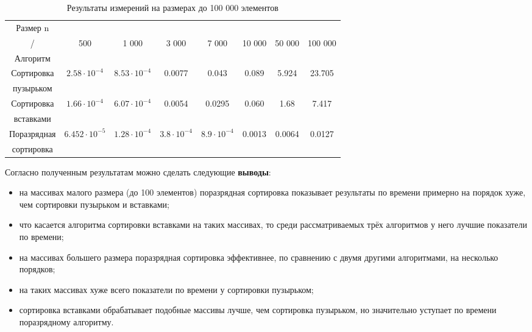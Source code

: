 \begin{table}[ph] \label{table_4_2}
	\caption{Результаты измерений на размерах до 100 000 элементов}
	\centering
	\begin{tabular}{|c|c|c|c|c|c|c|c|}
		\hline
		Размер n&&&&&&&\\
		/    &500 &1 000 & 3 000 & 7 000 & 10 000 & 50 000 & 100 000 \\
		Алгоритм    &&&&&&&\\
		\hline
		Сортировка & $2.58\cdot10^{-4}$ & $8.53\cdot10^{-4}$ & 0.0077 & 0.043 & 0.089 & 5.924 & 23.705\\
		пузырьком &&&&&&&\\
		\hline
		Сортировка & $1.66\cdot10^{-4}$ & $6.07\cdot10^{-4}$ & 0.0054 & 0.0295 & 0.060 & 1.68 & 7.417\\
		вставками &&&&&&&\\
		\hline
		Поразрядная & $6.452\cdot10^{-5}$ & $1.28\cdot10^{-4}$ & $3.8\cdot10^{-4}$ & $8.9\cdot10^{-4}$ & 0.0013 & 0.0064 & 0.0127\\
		сортировка &&&&&&&\\
		\hline
	\end{tabular}
\end{table}

Согласно полученным результатам можно сделать следующие \textbf{выводы}:
\begin{itemize}
	\item на массивах малого размера (до 100 элементов) поразрядная сортировка показывает результаты по времени примерно на порядок хуже, чем сортировки пузырьком и вставками;
	\item что касается алгоритма сортировки вставками на таких массивах, то среди рассматриваемых трёх алгоритмов у него лучшие показатели по времени;
	\item на массивах большего размера поразрядная сортировка эффективнее, по сравнению с двумя другими алгоритмами, на несколько порядков;
	\item на таких массивах хуже всего показатели по времени у сортировки пузырьком;
	\item сортировка вставками обрабатывает подобные массивы лучше, чем сортировка пузырьком, но значительно уступает по времени поразрядному алгоритму.
\end{itemize}
